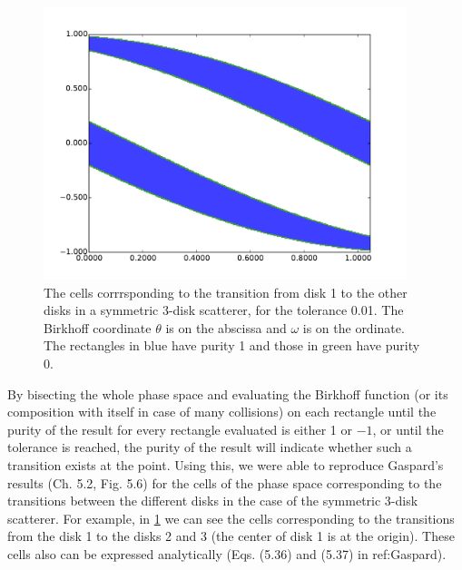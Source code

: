 \documentclass[pre, amsmath, amssymb, onecolumn, showpacs]{revtex4-1}
\begin{document}
\begin{figure}
\centering
\includegraphics*[width=300pt]{birkhoff-12-and-13_tol=1e-2.pdf}
\caption{The cells corrrsponding to the transition from disk 1 to the other disks in a symmetric 3-disk scatterer, for the tolerance 0.01. The Birkhoff coordinate $\theta$ is on the abscissa and $\omega$ is on the ordinate. The rectangles in blue have purity 1 and those in green have purity 0.}
\label{fig01}
\end{figure}

By bisecting the whole phase space and evaluating the Birkhoff function (or its composition with itself in case of many collisions) on each rectangle until the purity of the result for every rectangle evaluated is either 1 or $-1$, or until the tolerance is reached, the purity of the result will indicate whether such a transition exists at the point. Using this, we were able to reproduce Gaspard's results (Ch. 5.2, Fig. 5.6) for the cells of the phase space corresponding to the transitions between the different disks in the case of the symmetric 3-disk scatterer. For example, in \ref{fig01} we can see the cells corresponding to the transitions from the disk 1 to the disks 2 and 3 (the center of disk 1 is at the origin). These cells also can be expressed analytically (Eqs. (5.36) and (5.37) in ref:Gaspard). 














\vspace*{10pt}


%


\end{document}
